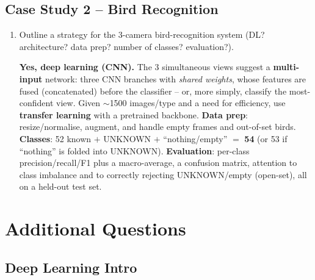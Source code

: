 \documentclass[10pt,a4paper]{article}
\newcommand{\q}[1]{\item #1}
\begin{document}
\subsection{Case Study 2 -- Bird Recognition}

\begin{enumerate}[leftmargin=*,label=\textbf{Q\arabic*.}]

\q Outline a strategy for the 3-camera bird-recognition system (DL? architecture? data prep? number of classes? evaluation?).
\begin{answerbox}
\textbf{Yes, deep learning (CNN).} The 3 simultaneous views suggest a \textbf{multi-input} network: three CNN branches with \emph{shared weights}, whose features are fused (concatenated) before the classifier -- or, more simply, classify the most-confident view. Given $\sim$1500 images/type and a need for efficiency, use \textbf{transfer learning} with a pretrained backbone. \textbf{Data prep}: resize/normalise, augment, and handle empty frames and out-of-set birds. \textbf{Classes}: 52 known $+$ UNKNOWN $+$ ``nothing/empty'' $=$ \textbf{54} (or 53 if ``nothing'' is folded into UNKNOWN). \textbf{Evaluation}: per-class precision/recall/F1 plus a macro-average, a confusion matrix, attention to class imbalance and to correctly rejecting UNKNOWN/empty (open-set), all on a held-out test set.
\end{answerbox}

\end{enumerate}

\newpage
\section{Additional Questions}
\subsection{Deep Learning Intro}
\end{document}
